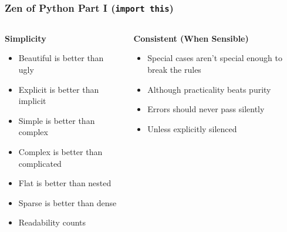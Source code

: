 \documentclass{beamer}
\begin{document}
\begin{frame}
 \frametitle{Zen of Python Part I (\texttt{import this})}
 \begin{columns}
   \begin{column}{0.53\textwidth}
   \textbf{Simplicity}
   \begin{itemize}
     \item Beautiful is better than ugly
     \item Explicit is better than implicit
     \item Simple is better than complex
     \item Complex is better than complicated
     \item Flat is better than nested
     \item Sparse is better than dense
     \item Readability counts
   \end{itemize}
 \end{column}
      
 \begin{column}{0.47\textwidth}
   \textbf{Consistent (When Sensible)}
    \begin{itemize}
      \item Special cases aren't special enough to break the rules
      \item Although practicality beats purity
      \item Errors should never pass silently
      \item Unless explicitly silenced
    \end{itemize}
 \end{column}
 \end{columns}
\end{frame}
\end{document}
